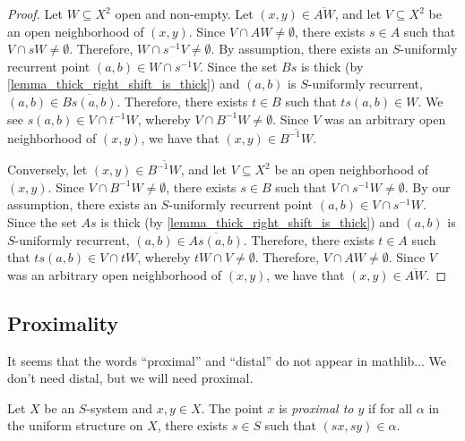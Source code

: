 \begin{proof}
\leanok{}
    Let $W \subseteq X^2$ open and non-empty.  Let $(x,y) \in \overline{AW}$, and let $V \subseteq X^2$ be an open neighborhood of $(x,y)$.  Since $V \cap AW \neq \emptyset$, there exists $s \in A$ such that $V \cap sW \neq \emptyset$.  Therefore, $W \cap s^{-1}V \neq \emptyset$. By assumption, there exists an $S$-uniformly recurrent point $(a,b) \in W \cap s^{-1}V$. Since the set $Bs$ is thick (by \cref{lemma_thick_right_shift_is_thick}) and $(a,b)$ is $S$-uniformly recurrent, $(a,b) \in \overline{Bs(a,b)}$.  Therefore, there exists $t \in B$ such that $ts(a,b) \in W$.  We see $s(a,b) \in V \cap t^{-1} W$, whereby $V \cap B^{-1} W \neq \emptyset$.  Since $V$ was an arbitrary open neighborhood of $(x,y)$, we have that $(x,y) \in \overline{B^{-1} W}$.

    Conversely, let $(x,y) \in \overline{B^{-1}W}$, and let $V \subseteq X^2$ be an open neighborhood of $(x,y)$.  Since $V \cap B^{-1}W \neq \emptyset$, there exists $s \in B$ such that $V \cap s^{-1}W \neq \emptyset$. By our assumption, there exists an $S$-uniformly recurrent point $(a,b) \in V \cap s^{-1}W$. Since the set $As$ is thick (by \cref{lemma_thick_right_shift_is_thick}) and $(a,b)$ is $S$-uniformly recurrent, $(a,b) \in \overline{As(a,b)}$.  Therefore, there exists $t \in A$ such that $ts(a,b) \in V \cap tW$, whereby $tW \cap V \neq \emptyset$.  Therefore, $V \cap A W \neq \emptyset$.  Since $V$ was an arbitrary open neighborhood of $(x,y)$, we have that $(x,y) \in \overline{A W}$.
\end{proof}



\subsection{Proximality}

\begin{leanrmk}
    It seems that the words ``proximal'' and ``distal'' do not appear in mathlib...  We don't need distal, but we will need proximal.
\end{leanrmk}

\begin{definition}
\label{def_proximal}
\leanok{}
    Let $X$ be an $S$-system and $x, y \in X$.  The point $x$ is \emph{proximal to $y$} if for all $\alpha$ in the uniform structure on $X$, there exists $s \in S$ such that $(sx,sy) \in \alpha$.
\end{definition}

